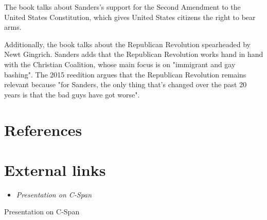 The book talks about Sanders's support for the Second Amendment to the
United States Constitution, which gives United States citizens the right
to bear arms.

Additionally, the book talks about the Republican Revolution spearheaded
by Newt Gingrich. Sanders adds that the Republican Revolution works hand
in hand with the Christian Coalition, whose main focus is on "immigrant
and gay bashing". The 2015 reedition argues that the Republican
Revolution remains relevant because "for Sanders, the only thing that's
changed over the past 20 years is that the bad guys have got worse".

\section{References}\label{references}

\section{External links}\label{external-links}

\begin{itemize}
\item
  \emph{Presentation on C-Span}
\end{itemize}

Presentation on C-Span
